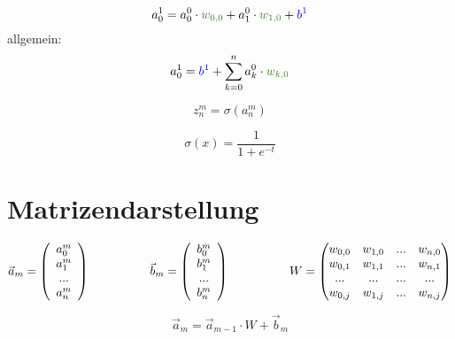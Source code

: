 \documentclass{article}
\begin{document}
\[ a_0^1 = a_0^0 \cdot \textcolor{OliveGreen}{w_{0,0}} + a_1^0 \cdot \textcolor{OliveGreen}{w_{1,0}} + \textcolor{blue}{b^1} \]
allgemein:
\[  a_0^1 = \textcolor{blue}{b^1} + \sum_{k=0}^{n} a_k^0 \cdot \textcolor{OliveGreen}{w_{k,0}}  \]

\[z_n^m = \sigma(a_n^m)\]

\[\sigma(x) = \frac{1}{1 + e^{-t}}\]


\section{Matrizendarstellung}

\[ \vec{a}_m = \left(\begin{array}{c} a_0^m \\ a_1^m \\ ... \\ a_n^m \end{array}\right) 
\kern 50pt
\vec{b}_m = \left(\begin{array}{c} b_0^m \\ b_1^m \\ ... \\ b_n^m \end{array}\right) 
\kern 50pt
W = \begin{pmatrix}
    w_{0,0} & w_{1,0} & ... & w_{n,0} \\
    w_{0,1} & w_{1,1} & ... & w_{n,1} \\
    ... & ... & ... & ... \\
    w_{0,j} & w_{1,j} & ... & w_{n,j}
\end{pmatrix} \]

\[ \vec{a}_m = \vec{a}_{m-1} \cdot W + \vec{b}_m \]
\end{document}
